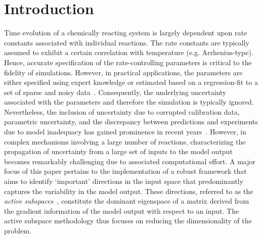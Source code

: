 \section{Introduction}
\label{sec:intro}



Time evolution of a chemically reacting system is largely dependent upon rate
constants associated with individual reactions. The rate constants are
typically assumed to exhibit a certain correlation with temperature (e.g.
Arrhenius-type). Hence, accurate specification of the rate-controlling
parameters is critical to the fidelity of simulations. However, in practical
applications, the parameters are either specified using expert knowledge or
estimated based on a regression-fit to a set of sparse and noisy
data~\cite{Burnham:1987, Burnham:1988, Vohra:2011, Sarathy:2012}.
Consequently, the underlying uncertainty associated with the parameters and
therefore the simulation is typically ignored. Nevertheless, the inclusion of
uncertainty due to corrupted calibration data, parametric uncertainty,
and the discrepancy between predictions and experiments
due to model inadequacy has gained prominence in recent
years~\cite{Vohra:2014, Vohra:2017, Morrison:2018, Hantouche:2018}. 
However, in complex mechanisms involving a large number of reactions,
characterizing the propagation of uncertainty from a large set of inputs to
the model output becomes remarkably challenging due to associated
computational effort. 
A major focus of this paper pertains to the implementation of a robust
framework that aims to identify `important' directions in the input space
that predominantly captures the variability in the model output. These
directions, referred to as the \textit{active subspaces}~\cite{Constantine:2015},
constitute the dominant
eigenspace of a matrix derived from the gradient information of the model
output with respect to an input. The active subspace methodology thus
focuses on reducing the dimensionality of the problem. 

